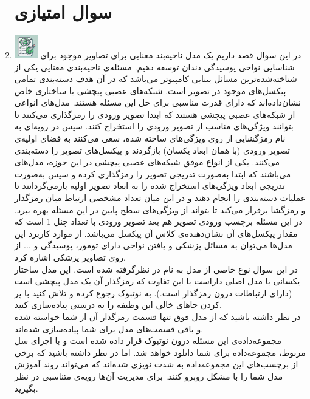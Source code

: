 \documentclass[12pt]{article}
\begin{document}
\begin{enumerate}
    \section*{سوال امتیازی} 
    \item \includegraphics[width=1cm]{figs/Allowed_with_contributino.jpg}
    در این سوال قصد داریم یک مدل ناحیه‌بند معنایی  برای تصاویر  موجود برای شناسایی نواحی پوسیدگی دندان توسعه دهیم. مسئله‌ی ناحیه‌بندی معنایی یکی از شناخته‌شده‌ترین مسائل بینایی کامپیوتر می‌باشد که در آن هدف دسته‌بندی تمامی پیکسل‌های موجود در تصویر است. شبکه‌های عصبی پیچشی با ساختاری خاص نشان‌داده‌اند که دارای قدرت مناسبی برای حل این مسئله هستند. مدل‌های  انواعی از شبکه‌های عصبی پیچشی هستند که ابتدا تصویر ورودی را رمزگذاری  می‌کنند تا بتوانند ویژگی‌های مناسب از تصویر ورودی را استخراج کنند. سپس در رویه‌ای به نام رمزگشایی  از روی ویژگی‌های ساخته شده، سعی می‌کنند به فضای اولیه‌ی تصویر ورودی (با همان ابعاد یکسان) بازگردند و پیکسل‌های تصویر را دسته‌بندی می‌کنند. یکی از انواع موفق شبکه‌های عصبی پیچشی در این حوزه، مدل‌های \href{https://arxiv.org/pdf/1505.04597}{} می‌باشند که ابتدا به‌صورت تدریجی تصویر را رمزگذاری کرده و سپس به‌صورت تدریجی ابعاد ویژگی‌های استخراج شده را به ابعاد تصویر اولیه بازمی‌گردانند تا عملیات دسته‌بندی را انجام دهند و در این میان تعداد مشخصی ارتباط میان رمزگذار و رمزگشا برقرار می‌کند تا بتواند از ویژگی‌های سطح پایین در این مسئله بهره ببرد. در این مسئله برچسب ورودی تصویر هم بعد تصویر ورودی با تعداد چنل 1 است که مقدار پیکسل‌های آن نشان‌دهنده‌ی کلاس آن پیکسل می‌باشد. از موارد کاربرد این مدل‌ها می‌توان به مسائل پزشکی و یافتن نواحی دارای تومور، پوسیدگی و ... از روی تصاویر پزشکی اشاره کرد.\\
    در این سوال نوع خاصی از مدل  به نام  در نظرگرفته شده است. این مدل ساختار یکسانی با مدل  اصلی داراست با این تفاوت که رمزگذار آن یک مدل پیچشی  است (دارای ارتباطات  درون رمزگذار است.). به نوتبوک  رجوع کرده و تلاش کنید با پر کردن جاهای خالی این وظیفه را به درستی پیاده‌سازی کنید.\\
    در نظر داشته باشید که از مدل فوق تنها قسمت رمزگذار آن از شما خواسته شده و باقی قسمت‌های مدل برای شما پیاده‌سازی شده‌اند.\\

    مجموعه‌داده‌ی این مسئله درون نوتبوک قرار داده شده است و با اجرای سل مربوط، مجموعه‌داده برای شما دانلود خواهد شد. اما در نظر داشته باشید که برخی از برچسب‌های این مجموعه‌داده به شدت نویزی شده‌اند که می‌تواند روند آموزش مدل شما را با مشکل روبرو کنند. برای مدیریت آن‌ها رویه‌ی متناسبی در نظر بگیرید.\\


\end{enumerate}
\end{document}
